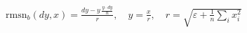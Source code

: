 \documentclass{article}
\begin{document}
\begin{preview}
$\displaystyle \mathrm{rmsn}_b(dy, x) = \frac{dy - y\,\frac{y\cdot dy}{n}}{r},\quad y = \frac{x}{r},\quad r = \sqrt{\varepsilon + \tfrac{1}{n}\sum_i x_i^2}$
\end{preview}
\end{document}
